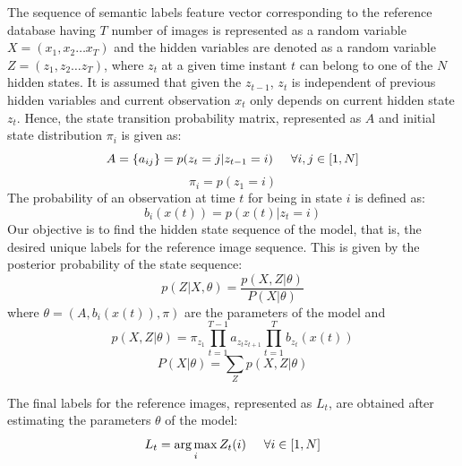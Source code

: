 \documentclass[letterpaper, 10 pt, conference]{ieeeconf}  %
\begin{document}
The sequence of semantic labels feature vector corresponding to the reference database having $T$ number of images is represented as a random variable $X=(x_1,x_2 \dots x_T)$ and the hidden variables are denoted as a random variable $Z=(z_1,z_2 \dots z_T)$, where $z_t$ at a given time instant $t$ can belong to one of the $N$ hidden states. It is assumed that given the $z_{t-1}$, $z_t$ is independent of previous hidden variables and current observation $x_t$ only depends on current hidden state $z_t$. Hence, the state transition probability matrix, represented as $A$ and initial state distribution $\pi_i$ is given as:
\begin{equation}
 A = \{a_{ij}\} = p(z_t=j|z_{t-1}=i) \hspace{0.5cm} \forall i,j \in [1,N]
\end{equation}
\begin{equation}
 \pi_i = p(z_1=i)
\end{equation}
The probability of an observation at time $t$ for being in state $i$ is defined as:
\begin{equation}
 b_i(x(t)) = p(x(t)|z_t=i)
\end{equation}
Our objective is to find the hidden state sequence of the model, that is, the desired unique labels for the reference image sequence. This is given by the posterior probability of the state sequence:
\begin{equation}
 p(Z|X,\theta) = \frac { p(X,Z|\theta) } { P(X|\theta) }
\end{equation}
where $\theta=(A,b_i(x(t)),\pi)$ are the parameters of the model and 
\begin{equation}
p( X,Z | \theta ) = \pi_{z_1} \prod\limits_{t=1}^{T-1}a_{z_tz_{t+1}} \prod\limits_{t=1}^{T}b_{z_t}(x(t))
\end{equation}
\begin{equation}
P(X | \theta) = \sum\limits_Z p( X,Z | \theta )
\end{equation}

The final labels for the reference images, represented as $L_t$, are obtained after estimating the parameters $\theta$ of the model:
\begin{equation}
 L_t = \operatorname*{arg\,max}_i Z_t(i) \hspace{0.5cm} \forall i \in [1,N]
\end{equation}
\end{document}

